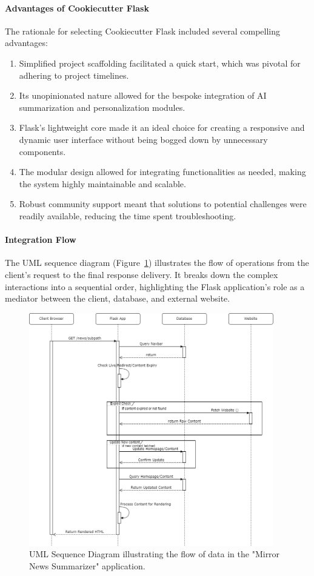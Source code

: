 \documentclass[10pt]{article}
\begin{document}
\paragraph{Advantages of Cookiecutter Flask}
The rationale for selecting Cookiecutter Flask included several compelling advantages:
\begin{enumerate}
    \item Simplified project scaffolding facilitated a quick start, which was pivotal for adhering to project timelines.
    \item Its unopinionated nature allowed for the bespoke integration of AI summarization and personalization modules.
    \item Flask's lightweight core made it an ideal choice for creating a responsive and dynamic user interface without being bogged down by unnecessary components.
    \item The modular design allowed for integrating functionalities as needed, making the system highly maintainable and scalable.
    \item Robust community support meant that solutions to potential challenges were readily available, reducing the time spent troubleshooting.
\end{enumerate}

\paragraph{Integration Flow}
The UML sequence diagram (Figure~\ref{fig:uml_sequence_diagram}) illustrates the flow of operations from the client's request to the final response delivery. It breaks down the complex interactions into a sequential order, highlighting the Flask application's role as a mediator between the client, database, and external website.

\begin{figure}[H]
    \centering
    \includegraphics[width=0.95\textwidth]{../UML_app.drawio.png}
    \caption{UML Sequence Diagram illustrating the flow of data in the "Mirror News Summarizer" application.}
    \label{fig:uml_sequence_diagram}
\end{figure}
\end{document}
